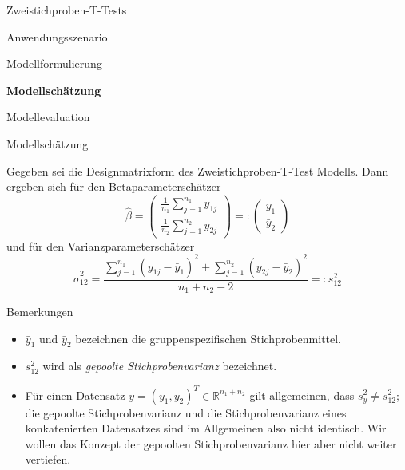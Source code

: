 \documentclass[
  8pt,
  ignorenonframetext,
]{beamer}
\providecommand{\tightlist}{%
  \setlength{\itemsep}{0pt}\setlength{\parskip}{0pt}}
\begin{document}
\begin{frame}{Zweistichproben-T-Tests}
\protect\hypertarget{zweistichproben-t-tests-3}{}
\large
{}
\vfill

Anwendungsszenario

Modellformulierung

\textbf{Modellschätzung}

Modellevaluation \vfill
\end{frame}

\begin{frame}{Modellschätzung}
\protect\hypertarget{modellschuxe4tzung-2}{}
\footnotesize
\begin{theorem}
\normalfont
\justifying
Gegeben sei die Designmatrixform des Zweistichproben-T-Test Modells. Dann ergeben
sich für den Betaparameterschätzer
\begin{equation}
\hat{\beta}
=  \begin{pmatrix} \frac{1}{n_1}\sum_{j=1}^{n_1} y_{1j} \\  \frac{1}{n_2}\sum_{j=1}^{n_2} y_{2j} \end{pmatrix}
=: \begin{pmatrix} \bar{y}_1 \\  \bar{y}_2 \end{pmatrix}
\end{equation}
und für den Varianzparameterschätzer
\begin{equation}
\hat{\sigma}^2_{12}
= \frac{\sum_{j=1}^{n_1} (y_{1j} - \bar{y}_1)^2 + \sum_{j=1}^{n_2} (y_{2j} - \bar{y}_2)^2}{n_1+n_2-2}
=: s_{12}^2
\end{equation}
\end{theorem}

Bemerkungen

\begin{itemize}
\tightlist
\item
  \justifying \(\bar{y}_1\) und \(\bar{y}_2\) bezeichnen die
  gruppenspezifischen Stichprobenmittel.
\item
  \(s_{12}^2\) wird als \textit{gepoolte Stichprobenvarianz} bezeichnet.
\item
  Für einen Datensatz \(y = (y_1,y_2)^T \in \mathbb{R}^{n_1 + n_2}\)
  gilt allgemeinen, dass \(s_y^2 \neq s_{12}^2\); die gepoolte
  Stichprobenvarianz und die Stichprobenvarianz eines konkatenierten
  Datensatzes sind im Allgemeinen also nicht identisch. Wir wollen das
  Konzept der gepoolten Stichprobenvarianz hier aber nicht weiter
  vertiefen.
\end{itemize}
\end{frame}
\end{document}
